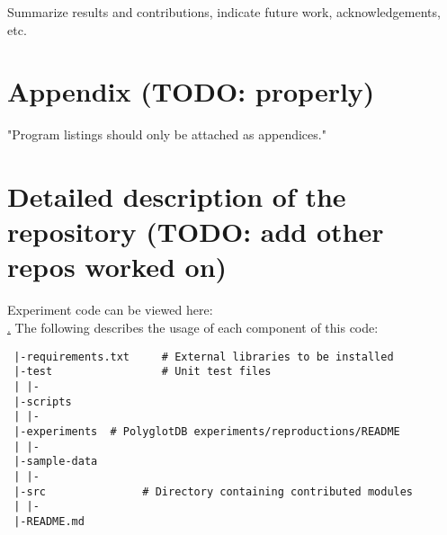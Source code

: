 \documentclass[twoside,11pt]{article}
\begin{document}
Summarize results and contributions, indicate future work, acknowledgements, etc.

\section{Appendix (TODO: properly)}

"Program listings should only be attached as appendices."

\section{Detailed description of the repository (TODO: add other repos worked on)}
\label{sec:repository}

Experiment code can be viewed here: \\ \href{https://github.com/michaelhaaf/mfa-workbook}. The following describes the usage of each component of this code:

\begin{verbatim}
 |-requirements.txt     # External libraries to be installed
 |-test                 # Unit test files
 | |-
 |-scripts    
 | |-
 |-experiments  # PolyglotDB experiments/reproductions/README
 | |-
 |-sample-data
 | |-
 |-src               # Directory containing contributed modules
 | |-
 |-README.md
\end{verbatim}





% 
\end{document}
